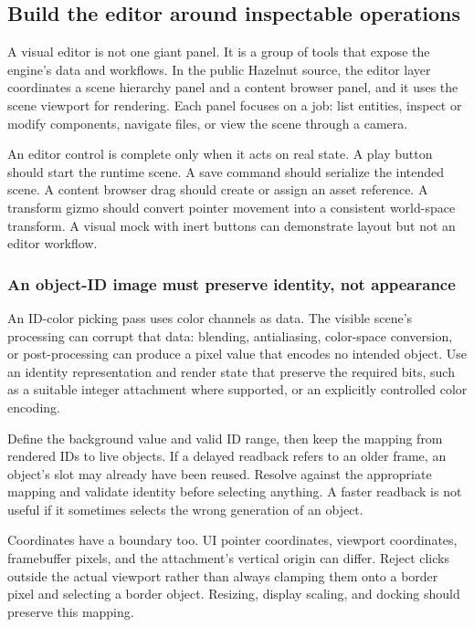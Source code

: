 \subsection{Build the editor around inspectable operations}\label{06-engine-ii-ch032-build-the-editor-around-inspectable-operations}

A visual editor is not one giant panel. It is a group of tools that expose the engine's data and workflows. In the public Hazelnut source, the editor layer coordinates a scene hierarchy panel and a content browser panel, and it uses the scene viewport for rendering. Each panel focuses on a job: list entities, inspect or modify components, navigate files, or view the scene through a camera.

An editor control is complete only when it acts on real state. A play button should start the runtime scene. A save command should serialize the intended scene. A content browser drag should create or assign an asset reference. A transform gizmo should convert pointer movement into a consistent world-space transform. A visual mock with inert buttons can demonstrate layout but not an editor workflow.

\subsubsection{An object-ID image must preserve identity, not appearance}\label{06-engine-ii-ch032-an-object-id-image-must-preserve-identity-not-appearance}

An ID-color picking pass uses color channels as data. The visible scene's processing can corrupt that data: blending, antialiasing, color-space conversion, or post-processing can produce a pixel value that encodes no intended object. Use an identity representation and render state that preserve the required bits, such as a suitable integer attachment where supported, or an explicitly controlled color encoding.

Define the background value and valid ID range, then keep the mapping from rendered IDs to live objects. If a delayed readback refers to an older frame, an object's slot may already have been reused. Resolve against the appropriate mapping and validate identity before selecting anything. A faster readback is not useful if it sometimes selects the wrong generation of an object.

Coordinates have a boundary too. UI pointer coordinates, viewport coordinates, framebuffer pixels, and the attachment's vertical origin can differ. Reject clicks outside the actual viewport rather than always clamping them onto a border pixel and selecting a border object. Resizing, display scaling, and docking should preserve this mapping.


